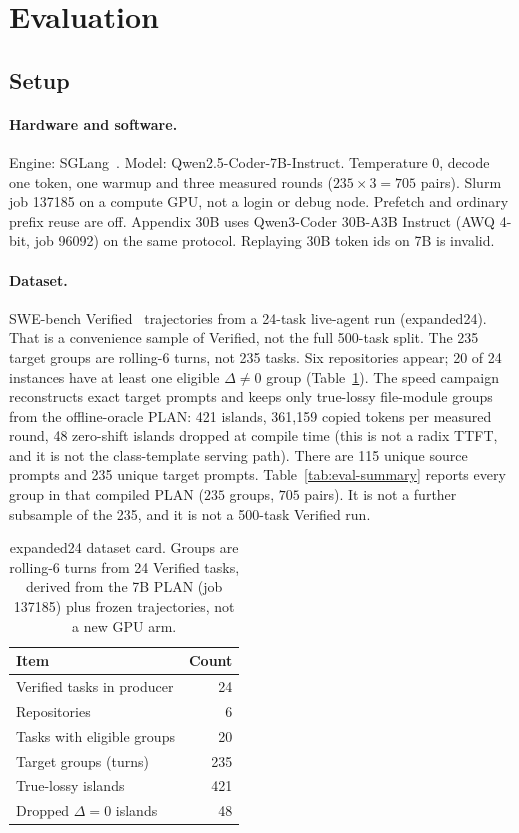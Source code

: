 \section{Evaluation}
\label{sec:evaluation}

\subsection{Setup}

\paragraph{Hardware and software.}
Engine: SGLang~\cite{sglang2024}. Model: Qwen2.5-Coder-7B-Instruct.
Temperature 0, decode one token, one warmup and three measured rounds
($235\times 3 = 705$ pairs). Slurm job 137185 on a compute GPU, not a
login or debug node. Prefetch and ordinary prefix reuse are off.
Appendix 30B uses Qwen3-Coder 30B-A3B Instruct (AWQ 4-bit, job 96092)
on the same protocol. Replaying 30B token ids on 7B is invalid.

\paragraph{Dataset.}
SWE-bench Verified~\cite{swebench} trajectories from a 24-task live-agent
run (expanded24). That is a convenience sample of Verified, not the full
500-task split. The 235 target groups are rolling-6 turns, not 235
tasks. Six repositories appear; 20 of 24 instances have at least one
eligible $\Delta\neq 0$ group (Table~\ref{tab:dataset}). The speed
campaign reconstructs exact target prompts and keeps only true-lossy
file-module groups from the offline-oracle PLAN: 421 islands, 361{,}159 copied tokens per measured
round, 48 zero-shift islands dropped at compile time (this is
not a radix TTFT, and it is not the class-template serving path). There are 115 unique source prompts and 235 unique
target prompts. Table~\ref{tab:eval-summary} reports every group in that
compiled PLAN ($235$ groups, $705$ pairs). It is not a further
subsample of the 235, and it is not a 500-task Verified run.

\begin{table}[t]
\centering
\small
\caption{expanded24 dataset card. Groups are rolling-6 turns from 24
Verified tasks, derived from the 7B PLAN (job 137185) plus frozen
trajectories, not a new GPU arm.}
\label{tab:dataset}
\begin{tabular}{lr}
\toprule
\textbf{Item} & \textbf{Count} \\
\midrule
Verified tasks in producer & 24 \\
Repositories & 6 \\
Tasks with eligible groups & 20 \\
Target groups (turns) & 235 \\
True-lossy islands & 421 \\
Dropped $\Delta{=}0$ islands & 48 \\
\bottomrule
\end{tabular}
\end{table}

